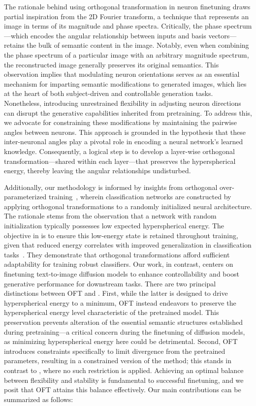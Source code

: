 The rationale behind using orthogonal transformation in neuron finetuning draws partial inspiration from the 2D Fourier transform, a technique that represents an image in terms of its magnitude and phase spectra. Critically, the phase spectrum—which encodes the angular relationship between inputs and basis vectors—retains the bulk of semantic content in the image. Notably, even when combining the phase spectrum of a particular image with an arbitrary magnitude spectrum, the reconstructed image generally preserves its original semantics. This observation implies that modulating neuron orientations serves as an essential mechanism for imparting semantic modifications to generated images, which lies at the heart of both subject-driven and controllable generation tasks. Nonetheless, introducing unrestrained flexibility in adjusting neuron directions can disrupt the generative capabilities inherited from pretraining. To address this, we advocate for constraining these modifications by maintaining the pairwise angles between neurons. This approach is grounded in the hypothesis that these inter-neuronal angles play a pivotal role in encoding a neural network’s learned knowledge. Consequently, a logical step is to develop a layer-wise orthogonal transformation—shared within each layer—that preserves the hyperspherical energy, thereby leaving the angular relationships undisturbed.

Additionally, our methodology is informed by insights from orthogonal over-parameterized training~\cite{liu2021orthogonal}, wherein classification networks are constructed by applying orthogonal transformations to a randomly initialized neural architecture. The rationale stems from the observation that a network with random initialization typically possesses low expected hyperspherical energy. The objective in \cite{liu2021orthogonal} is to ensure this low-energy state is retained throughout training, given that reduced energy correlates with improved generalization in classification tasks~\cite{liu2018learning,lin2020regularizing}. They demonstrate that orthogonal transformations afford sufficient adaptability for training robust classifiers. Our work, in contrast, centers on finetuning text-to-image diffusion models to enhance controllability and boost generative performance for downstream tasks. There are two principal distinctions between OFT and \cite{liu2021orthogonal}. First, while the latter is designed to drive hyperspherical energy to a minimum, OFT instead endeavors to preserve the hyperspherical energy level characteristic of the pretrained model. This preservation prevents alteration of the essential semantic structures established during pretraining—a critical concern during the finetuning of diffusion models, as minimizing hyperspherical energy here could be detrimental. Second, OFT introduces constraints specifically to limit divergence from the pretrained parameters, resulting in a constrained version of the method; this stands in contrast to \cite{liu2021orthogonal}, where no such restriction is applied. Achieving an optimal balance between flexibility and stability is fundamental to successful finetuning, and we posit that OFT attains this balance effectively. Our main contributions can be summarized as follows:

